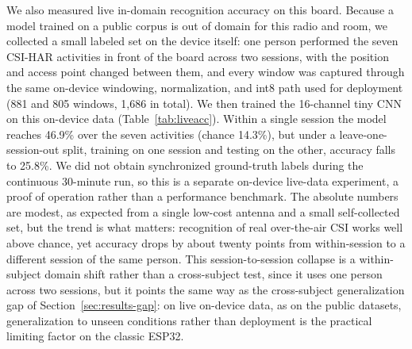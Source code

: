 \documentclass{ieeeaccess}
\begin{document}
We also measured live in-domain recognition accuracy on this board. Because a model trained on a public corpus is out of domain for this radio and room, we collected a small labeled set on the device itself: one person performed the seven CSI-HAR activities in front of the board across two sessions, with the position and access point changed between them, and every window was captured through the same on-device windowing, normalization, and int8 path used for deployment (881 and 805 windows, 1{,}686 in total). We then trained the 16-channel tiny CNN on this on-device data (Table~\ref{tab:liveacc}). Within a single session the model reaches 46.9\% over the seven activities (chance 14.3\%), but under a leave-one-session-out split, training on one session and testing on the other, accuracy falls to 25.8\%. We did not obtain synchronized ground-truth labels during the continuous 30-minute run, so this is a separate on-device live-data experiment, a proof of operation rather than a performance benchmark. The absolute numbers are modest, as expected from a single low-cost antenna and a small self-collected set, but the trend is what matters: recognition of real over-the-air CSI works well above chance, yet accuracy drops by about twenty points from within-session to a different session of the same person. This session-to-session collapse is a within-subject domain shift rather than a cross-subject test, since it uses one person across two sessions, but it points the same way as the cross-subject generalization gap of Section~\ref{sec:results-gap}: on live on-device data, as on the public datasets, generalization to unseen conditions rather than deployment is the practical limiting factor on the classic ESP32.
\end{document}
